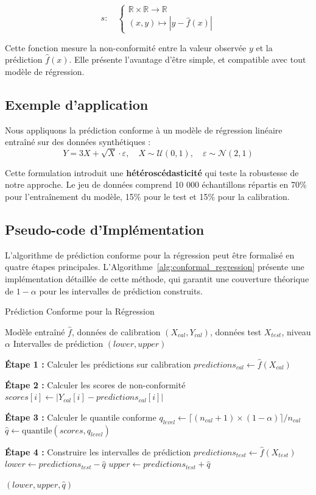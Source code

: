 \documentclass[a4paper,12pt]{article}
\begin{document}
\[
s : \quad
\left\{
\begin{array}{l}
\mathbb{R} \times \mathbb{R} \to \mathbb{R} \\
(x, y) \mapsto | y - \hat{f}(x) |
\end{array}
\right.
\]


Cette fonction mesure la non-conformité entre la valeur observée $y$ et la prédiction $\hat{f}(x)$. Elle présente l'avantage d'être simple, et compatible avec tout modèle de régression.

\subsection{Exemple d'application}

Nous appliquons la prédiction conforme à un modèle de régression linéaire entraîné sur des données synthétiques :
$$Y = 3X + \sqrt{X} \cdot \varepsilon, \quad X \sim \mathcal{U}(0,1),\quad \varepsilon \sim \mathcal{N}(2,1)$$


Cette formulation introduit une \textbf{hétéroscédasticité} qui teste la robustesse de notre approche. Le jeu de données comprend 10 000 échantillons répartis en 70\% pour l'entraînement du modèle, 15\% pour le test et 15\% pour la calibration.
\subsection{Pseudo-code d'Implémentation}

L'algorithme de prédiction conforme pour la régression peut être formalisé en quatre étapes principales. L'Algorithme~\ref{alg:conformal_regression} présente une implémentation détaillée de cette méthode, qui garantit une couverture théorique de $1-\alpha$ pour les intervalles de prédiction construits.

\begin{algorithm}
\caption{Prédiction Conforme pour la Régression}
\label{alg:conformal_regression}
\begin{algorithmic}[1]
\REQUIRE Modèle entraîné $\hat{f}$, données de calibration $(X_{cal}, Y_{cal})$, données test $X_{test}$, niveau $\alpha$
\ENSURE Intervalles de prédiction $(lower, upper)$

\STATE \textbf{Étape 1 :} Calculer les prédictions sur calibration
\STATE $predictions_{cal} \leftarrow \hat{f}(X_{cal})$

\STATE \textbf{Étape 2 :} Calculer les scores de non-conformité
    \STATE $scores[i] \leftarrow |Y_{cal}[i] - predictions_{cal}[i]|$
\ENDFOR

\STATE \textbf{Étape 3 :} Calculer le quantile conforme
\STATE $q_{level} \leftarrow \lceil (n_{cal} + 1) \times (1 - \alpha) \rceil / n_{cal}$
\STATE $\hat{q} \leftarrow \text{quantile}(scores, q_{level})$

\STATE \textbf{Étape 4 :} Construire les intervalles de prédiction
\STATE $predictions_{test} \leftarrow \hat{f}(X_{test})$
\STATE $lower \leftarrow predictions_{test} - \hat{q}$
\STATE $upper \leftarrow predictions_{test} + \hat{q}$

\RETURN $(lower, upper, \hat{q})$
\end{algorithmic}
\end{algorithm}
\end{document}
